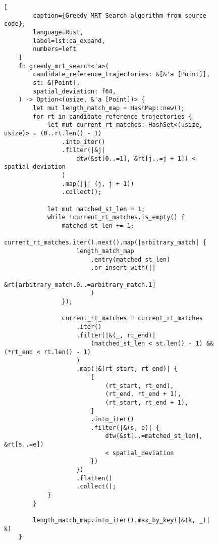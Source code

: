 \begin{figure}[t]
    \begin{lstlisting}[
        caption={Greedy MRT Search algorithm from source code},
        language=Rust,
        label=lst:ca_expand,
        numbers=left
    ]
    fn greedy_mrt_search<'a>(
        candidate_reference_trajectories: &[&'a [Point]],
        st: &[Point],
        spatial_deviation: f64,
    ) -> Option<(usize, &'a [Point])> {
        let mut length_match_map = HashMap::new();
        for rt in candidate_reference_trajectories {
            let mut current_rt_matches: HashSet<(usize, usize)> = (0..rt.len() - 1)
                .into_iter()
                .filter(|&j|
                    dtw(&st[0..=1], &rt[j..=j + 1]) < spatial_deviation
                )
                .map(|j| (j, j + 1))
                .collect();
    
            let mut matched_st_len = 1;
            while !current_rt_matches.is_empty() {
                matched_st_len += 1;
                current_rt_matches.iter().next().map(|arbitrary_match| {
                    length_match_map
                        .entry(matched_st_len)
                        .or_insert_with(||
                            &rt[arbitrary_match.0..=arbitrary_match.1]
                        )
                });
                
                current_rt_matches = current_rt_matches
                    .iter()
                    .filter(|&(_, rt_end)|
                        (matched_st_len < st.len() - 1) && (*rt_end < rt.len() - 1)
                    )
                    .map(|&(rt_start, rt_end)| {
                        [
                            (rt_start, rt_end),
                            (rt_end, rt_end + 1),
                            (rt_start, rt_end + 1),
                        ]
                        .into_iter()
                        .filter(|&(s, e)| {
                            dtw(&st[..=matched_st_len], &rt[s..=e]) 
                            < spatial_deviation
                        })
                    })
                    .flatten()
                    .collect();
            }
        }
    
        length_match_map.into_iter().max_by_key(|&(k, _)| k)
    }
    \end{lstlisting}
\end{figure}